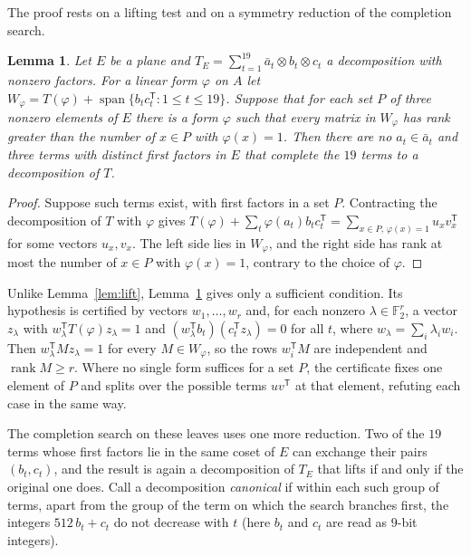 \documentclass[11pt]{amsart}
\newtheorem{lemma}[theorem]{Lemma}
\theoremstyle{definition}
\theoremstyle{remark}
\numberwithin{equation}{section}
\newcommand{\F}{\mathbb{F}_2}
\newcommand{\rk}{\operatorname{rank}}
\begin{document}
The proof rests on a lifting test and on a symmetry reduction of the completion search.

\begin{lemma}\label{lem:liftplane}
Let $E$ be a plane and $T_E=\sum_{t=1}^{19}\bar a_t\otimes b_t\otimes c_t$ a decomposition with nonzero factors. For a linear form $\varphi$ on $A$ let $W_\varphi=T(\varphi)+\operatorname{span}\{b_tc_t^{\mathsf T}:1\le t\le 19\}$. Suppose that for each set $P$ of three nonzero elements of $E$ there is a form $\varphi$ such that every matrix in $W_\varphi$ has rank greater than the number of $x\in P$ with $\varphi(x)=1$. Then there are no $a_t\in\bar a_t$ and three terms with distinct first factors in $E$ that complete the $19$ terms to a decomposition of $T$.
\end{lemma}

\begin{proof}
Suppose such terms exist, with first factors in a set $P$. Contracting the decomposition of $T$ with $\varphi$ gives $T(\varphi)+\sum_t\varphi(a_t)b_tc_t^{\mathsf T}=\sum_{x\in P,\,\varphi(x)=1}u_xv_x^{\mathsf T}$ for some vectors $u_x,v_x$. The left side lies in $W_\varphi$, and the right side has rank at most the number of $x\in P$ with $\varphi(x)=1$, contrary to the choice of $\varphi$.
\end{proof}

Unlike Lemma~\ref{lem:lift}, Lemma~\ref{lem:liftplane} gives only a sufficient condition. Its hypothesis is certified by vectors $w_1,\dots,w_r$ and, for each nonzero $\lambda\in\F^r$, a vector $z_\lambda$ with $w_\lambda^{\mathsf T}T(\varphi)z_\lambda=1$ and $(w_\lambda^{\mathsf T}b_t)(c_t^{\mathsf T}z_\lambda)=0$ for all $t$, where $w_\lambda=\sum_i\lambda_iw_i$. Then $w_\lambda^{\mathsf T}Mz_\lambda=1$ for every $M\in W_\varphi$, so the rows $w_i^{\mathsf T}M$ are independent and $\rk M\ge r$. Where no single form suffices for a set $P$, the certificate fixes one element of $P$ and splits over the possible terms $uv^{\mathsf T}$ at that element, refuting each case in the same way.

The completion search on these leaves uses one more reduction. Two of the $19$ terms whose first factors lie in the same coset of $E$ can exchange their pairs $(b_t,c_t)$, and the result is again a decomposition of $T_E$ that lifts if and only if the original one does. Call a decomposition \emph{canonical} if within each such group of terms, apart from the group of the term on which the search branches first, the integers $512\,b_t+c_t$ do not decrease with $t$ (here $b_t$ and $c_t$ are read as $9$-bit integers).
\end{document}
